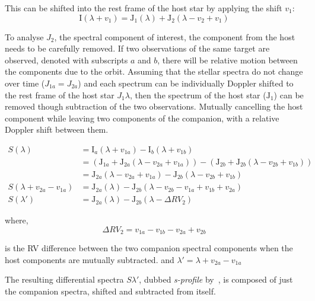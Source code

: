This can be shifted into the rest frame of the host star by applying the shift \(v_1\):
\begin{equation}
\textrm{I}(\lambda + v_{1}) = \textrm{J}_{1}(\lambda) + \textrm{J}_{2}(\lambda - v_{2} + v_{1})
\end{equation}

To analyse \(J_2\), the spectral component of interest, the component from the host needs to be carefully removed. If two observations of the same target are observed, denoted with subscripts \(a\) and \(b\), there will be relative motion between the components due to the orbit. Assuming that the stellar spectra do not change over time (\(J_{1a} = J_{2a}\)) and each spectrum can be individually Doppler shifted to the rest frame of the host star \(J_1{\lambda}\), then the spectrum of the host star (\(\textrm{J}_{1}\)) can be removed though subtraction of the two observations. Mutually cancelling the host component while leaving two components of the companion, with a relative Doppler shift between them.

\begin{align}
S(\lambda) &= \textrm{I}_{a}(\lambda + v_{1a}) - \textrm{I}_{b}(\lambda + v_{1b}) \nonumber \\
&= (\textrm{J}_{1a} + \textrm{J}_{2a}(\lambda - v_{2a} + v_{1a})) - (\textrm{J}_{2b} +\textrm{J}_{2b}(\lambda - v_{2b} + v_{1b})) \nonumber \\
&= \textrm{J}_{2a}(\lambda - v_{2a} + v_{1a}) - \textrm{J}_{2b}(\lambda - v_{2b} + v_{1b}) \nonumber \\
S(\lambda + v_{2a}-v_{1a}) &= \textrm{J}_{2a}(\lambda) - \textrm{J}_{2b}(\lambda - v_{2b} - v_{1a} + v_{1b} + v_{2a})\\
S(\lambda') &= \textrm{J}_{2a}(\lambda) - \textrm{J}_{2b}(\lambda - \Delta {RV}_2) \label{eqn:sprofile}
\end{align}

where,
\begin{equation}
\Delta {RV}_2 = v_{1a} - v_{1b} - v_{2a} + v_{2b} \label{eqn:companion_difference}
\end{equation}

is the {RV} difference between the two companion spectral components when the host components are mutually subtracted.
and \(\lambda' = \lambda + v_{2a}-v_{1a}\)

The resulting differential spectra \(S{\lambda'}\), dubbed \emph{s-profile} by~\citet{ferluga_separating_1997}, is composed of just the companion spectra, shifted and subtracted from itself.

